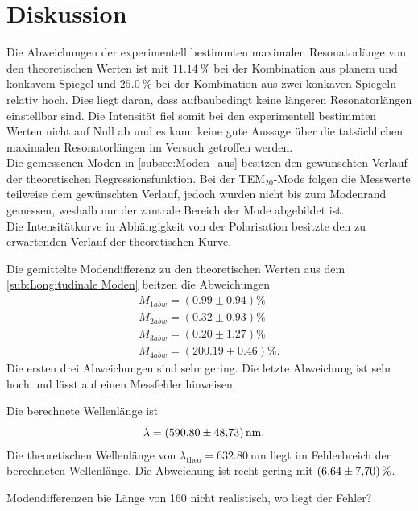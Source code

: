 \section{Diskussion}
\label{sec:Diskussion}

Die Abweichungen der experimentell bestimmten maximalen Resonatorlänge von den theoretischen Werten ist mit $\qty{11.14}{\percent}$ bei der Kombination
aus planem und konkavem Spiegel und $\qty{25.0}{\percent}$ bei der Kombination aus zwei konkaven Spiegeln relativ hoch.
Dies liegt daran, dass aufbaubedingt keine längeren Resonatorlängen einstellbar sind. Die Intensität fiel somit bei den experimentell bestimmten
Werten nicht auf Null ab und es kann keine gute Aussage über die tatsächlichen maximalen Resonatorlängen im Versuch getroffen werden.\\

Die gemessenen Moden in \autoref{subsec:Moden_aus} besitzen den gewünschten Verlauf der theoretischen Regressionsfunktion. Bei der TEM$_{20}$-Mode folgen die Messwerte teilweise dem gewünschten 
Verlauf, jedoch wurden nicht bis zum Modenrand gemessen, weshalb nur der zantrale Bereich der Mode abgebildet ist.\\


Die Intensitätkurve in Abhängigkeit von der Polarisation besitzte den zu erwartenden Verlauf der theoretischen Kurve.

Die gemittelte Modendifferenz zu den theoretischen Werten aus dem \autoref{sub:Longitudinale Moden} beitzen die Abweichungen
\begin{align}
    M_{1 abw} = (0.99 \pm 0.94) \si{\percent}\\
    M_{2 abw} = (0.32 \pm 0.93) \si{\percent}\\
    M_{3 abw} = (0.20 \pm 1.27) \si{\percent}\\
    M_{4 abw} = (200.19 \pm 0.46) \si{\percent}.
\end{align}
Die ersten drei Abweichungen sind sehr gering. Die letzte Abweichung ist sehr hoch und lässt auf einen Messfehler hinweisen.

Die berechnete Wellenlänge ist 
\begin{align*}
    \bar{\lambda} &= \qty{590.80 \pm 48.73}{\nano\meter}.
\end{align*}
Die theoretischen Wellenlänge von $\lambda_{\text{theo}}= \qty{632.80}{\nano\meter}$ liegt im Fehlerbreich der berechneten Wellenlänge. Die Abweichung ist recht gering mit 
$\qty{6.64 \pm 7.70}{\percent}$.




Modendifferenzen bie Länge von 160 nicht realistisch, wo liegt der Fehler?